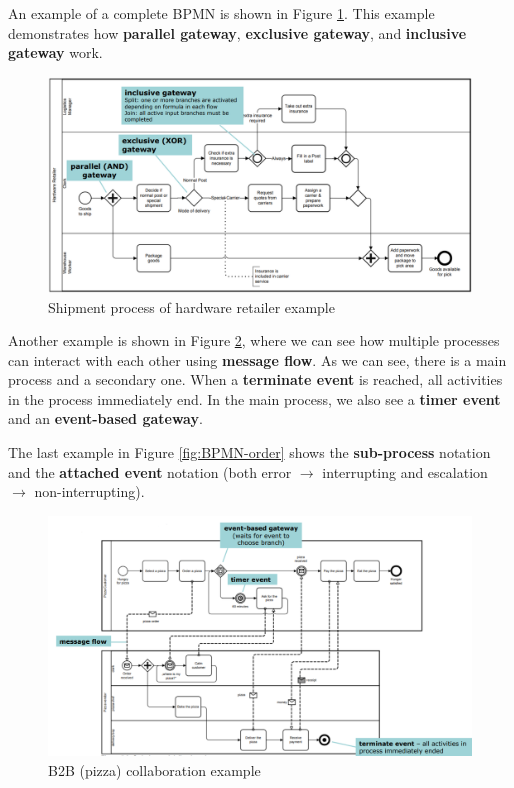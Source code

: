 \noindent An example of a complete BPMN is shown in Figure \ref{fig:BPMN-ship}. This example demonstrates how \textbf{parallel gateway}, \textbf{exclusive gateway}, and \textbf{inclusive gateway} work.

\begin{figure} [H]
    \centering
    \includegraphics[width=1\textwidth]{images/BusinessProcessModeling/BPMN-ship.PNG}
    \caption{Shipment process of hardware retailer example}
    \label{fig:BPMN-ship}
\end{figure} 

\noindent Another example is shown in Figure \ref{fig:BPMN-pizza}, where we can see how multiple processes can interact with each other using \textbf{message flow}. As we can see, there is a main process and a secondary one. When a \textbf{terminate event} is reached, all activities in the process immediately end. In the main process, we also see a \textbf{timer event} and an \textbf{event-based gateway}.

The last example in Figure \ref{fig:BPMN-order} shows the \textbf{sub-process} notation and the \textbf{attached event} notation (both error $\rightarrow$ interrupting and escalation $\rightarrow$ non-interrupting).

\begin{figure} [H]
    \centering
    \includegraphics[width=1\textwidth]{images/BusinessProcessModeling/BPMN-pizza.PNG}
    \caption{B2B (pizza) collaboration example}
    \label{fig:BPMN-pizza}
\end{figure} 

